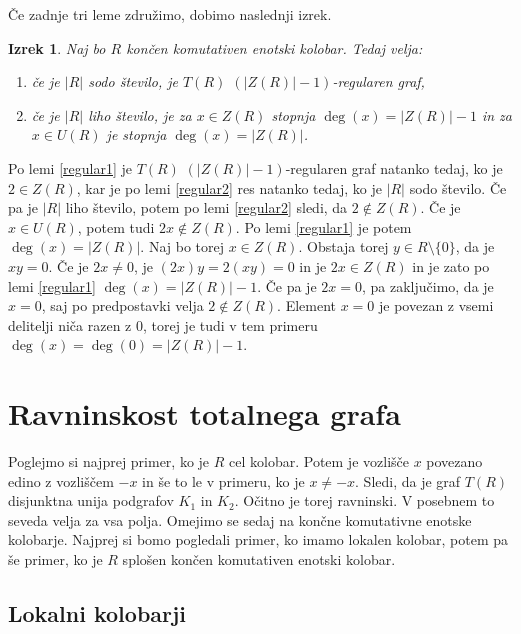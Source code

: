 \documentclass[a4paper, 12pt]{amsart}
\theoremstyle{definition} %
\theoremstyle{plain} %
\newtheorem{izrek}[definicija]{Izrek}
\begin{document}
Če zadnje tri leme združimo, dobimo naslednji izrek.

\begin{izrek}
\label{regularnostT(R)}
Naj bo $R$ končen komutativen enotski  kolobar. Tedaj velja:
 \begin{enumerate}
\item če je $|R|$ sodo število, je $T(R)$ $(|Z(R)| -1)$-regularen graf,
\item če je $|R|$ liho število, je za $x\in Z(R)$ stopnja $\deg(x) = |Z(R)| - 1$ in za $x\in U(R)$ je stopnja $\deg(x) = |Z(R)|$.
\end{enumerate}
\end{izrek}

\proof
Po lemi \ref{regular1} je $T(R)$ $(|Z(R)| -1)$-regularen graf natanko tedaj, ko je $2\in Z(R)$, kar je po lemi \ref{regular2}  res natanko tedaj, ko je $|R|$ sodo število. Če pa je $|R|$ liho število, potem po lemi \ref{regular2} sledi, da $2\notin Z(R)$. Če je $x \in U(R)$, potem tudi $2x\notin Z(R)$. Po lemi \ref{regular1} je potem $\deg(x) = |Z(R)|$. Naj bo torej $x\in Z(R)$. Obstaja torej $y\in R \setminus \{0\}$, da je $xy=0$. Če je $2x \neq 0$, je $(2x) y = 2(xy) = 0$ in je $2x\in Z(R)$ in je zato po lemi \ref{regular1} $\deg(x) = |Z(R)|-1$. Če pa je $2x = 0$, pa zaključimo, da je $x=0$, saj po predpostavki velja $2\notin Z(R)$. Element $x=0$ je povezan z vsemi delitelji niča razen z 0, torej je tudi v tem primeru $\deg(x) = \deg(0) = |Z(R)| - 1$.
\endproof

\section{Ravninskost totalnega grafa}

Poglejmo si najprej primer, ko je $R$ cel kolobar. Potem je vozlišče $x$ povezano edino z vozliščem $-x$ in še to le v primeru, ko je $x\neq -x$. Sledi, da je graf $T(R)$ disjunktna unija podgrafov $K_1$ in $K_2$. Očitno je torej ravninski. V posebnem to seveda velja za vsa polja. Omejimo se sedaj na končne komutativne enotske kolobarje.  Najprej si bomo pogledali primer, ko imamo lokalen kolobar, potem pa še primer, ko je $R$ splošen končen komutativen enotski kolobar.

\subsection{Lokalni kolobarji}
\end{document}
